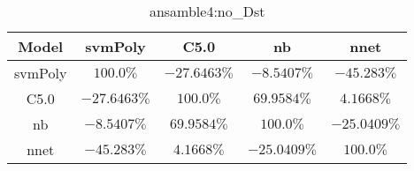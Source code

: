 \begin{table}[!ht]
	\centering
	\begin{tabular}{|c|c|c|c|c|}
		\hline
		Model & svmPoly & C5.0 & nb & nnet \\ \hline
		svmPoly & $100.0\%$ & $-27.6463\%$ & $-8.5407\%$ & $-45.283\%$ \\ \hline
		C5.0 & $-27.6463\%$ & $100.0\%$ & $69.9584\%$ & $4.1668\%$ \\ \hline
		nb & $-8.5407\%$ & $69.9584\%$ & $100.0\%$ & $-25.0409\%$ \\ \hline
		nnet & $-45.283\%$ & $4.1668\%$ & $-25.0409\%$ & $100.0\%$ \\ \hline
	\end{tabular}
	\caption{ansamble4:no_Dst}
	\label{tab:ansamble4:no_Dst}
\end{table}
